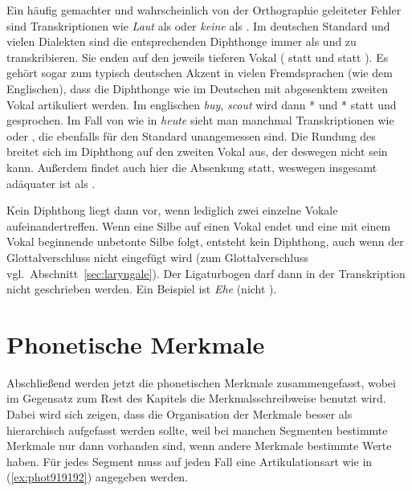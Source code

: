 Ein häufig gemachter und wahrscheinlich von der Orthographie geleiteter Fehler sind Transkriptionen wie \textit{Laut} als \Ast\textipa{[l\t{aU}t]} oder \textit{keine} als \Ast\textipa{[k\t{aI}ne]}.
Im deutschen Standard und vielen Dialekten sind die entsprechenden Diphthonge immer als \textipa{[\t{aE}]} und \textipa{[\t{aO}]} zu transkribieren.
Sie enden auf den jeweils tieferen Vokal (\textipa{[O]} statt \textipa{[U]} und \textipa{[E]} statt \textipa{[I]}).
Es gehört sogar zum typisch deutschen Akzent in vielen Fremdsprachen (wie \zB dem Englischen), dass die Diphthonge wie im Deutschen mit abgesenktem zweiten Vokal artikuliert werden.
Im englischen \textit{buy}, \textit{scout} wird dann *\textipa{[b\t{aE}]} und *\textipa{[sk\t{aO}t]} statt \textipa{[b\t{aI}]} und \textipa{[sk\t{aU}t]} gesprochen.
Im Fall von \textipa{[\t{O\oe}]} wie in \textit{heute} \textipa{[h\t{O\oe}t@]} sieht man manchmal Transkriptionen wie \textipa{[\t{OI}]} oder \textipa{[\t{OY}]}, die ebenfalls für den Standard unangemessen sind.
Die Rundung des \textipa{[O]} breitet sich im Diphthong auf den zweiten Vokal aus, der deswegen nicht \textipa{[I]} sein kann.
Außerdem findet auch hier die Absenkung statt, weswegen insgesamt \textipa{[\t{O\oe}]} adäquater ist als \textipa{[\t{OY}]}.

Kein Diphthong liegt dann vor, wenn lediglich zwei einzelne Vokale aufeinandertreffen.
Wenn eine Silbe auf einen Vokal endet und eine mit einem Vokal beginnende unbetonte Silbe folgt, entsteht kein Diphthong, auch wenn der Glottalverschluss nicht eingefügt wird (zum Glottalverschluss vgl.\ Abschnitt~\ref{sec:laryngale}).
Der Ligaturbogen darf dann in der Transkription nicht geschrieben werden.
Ein Beispiel ist \textit{Ehe} \textipa{[Pe:@]} (nicht \Ast\textipa{[P\t{e@}]}).




\section{Phonetische Merkmale}

\label{sec:phonetischemerkmale}

Abschließend werden jetzt die phonetischen Merkmale zusammengefasst, wobei im Gegensatz zum Rest des Kapitels die Merkmalsschreibweise benutzt wird.
Dabei wird sich zeigen, dass die Organisation der Merkmale besser als hierarchisch aufgefasst werden sollte, weil bei manchen Segmenten bestimmte Merkmale nur dann vorhanden sind, wenn andere Merkmale bestimmte Werte haben.
Für jedes Segment muss auf jeden Fall eine Artikulationsart wie in (\ref{ex:phot919192}) angegeben werden.

